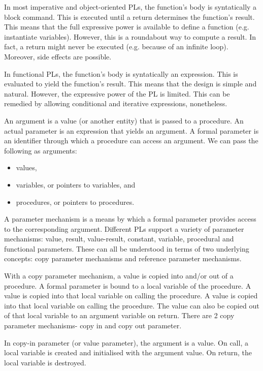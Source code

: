 \documentclass[a4paper, openany]{memoir}
\begin{document}
In most imperative and object-oriented PLs, the function's body is syntatically a block command. This is executed until a return determines the function's result. This means that the full expressive power is available to define a function (e.g. instantiate variables). However, this is a roundabout way to compute a result. In fact, a return might never be executed (e.g. because of an infinite loop). Moreover, side effects are possible.

In functional PLs, the function's body is syntatically an expression. This is evaluated to yield the function's result. This means that the design is simple and natural. However, the expressive power of the PL is limited. This can be remedied by allowing conditional and iterative expressions, nonetheless.

An argument is a value (or another entity) that is passed to a procedure. An actual parameter is an expression that yields an argument. A formal parameter is an identifier through which a procedure can access an argument. We can pass the following as arguments:
\begin{itemize}
    \item values,
    \item variables, or pointers to variables, and
    \item procedures, or pointers to procedures.
\end{itemize}

A parameter mechanism is a means by which a formal parameter provides access to the corresponding argument. Different PLs support a variety of parameter mechanisms: value, result, value-result, constant, variable, procedural and functional parameters. These can all be understood in terms of two underlying concepts: copy parameter mechanisms and reference parameter mechanisms.

With a copy parameter mechanism, a value is copied into and/or out of a procedure. A formal parameter is bound to a local variable of the procedure. A value is copied into that local variable on calling the procedure. A value is copied into that local variable on calling the procedure. The value can also be copied out of that local variable to an argument variable on return. There are 2 copy parameter mechanisms- copy in and copy out parameter.

In copy-in parameter (or value parameter), the argument is a value. On call, a local variable is created and initialised with the argument value. On return, the local variable is destroyed.
\end{document}
